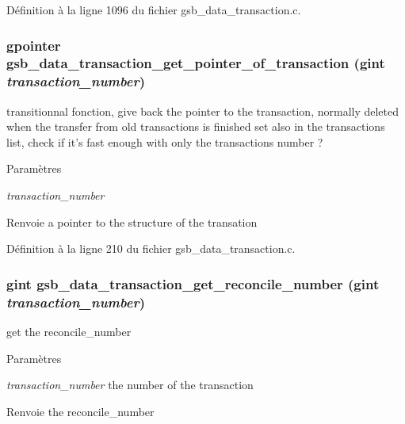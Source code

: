 Définition à la ligne 1096 du fichier gsb\_\-data\_\-transaction.c.

\subsubsection[{gsb\_\-data\_\-transaction\_\-get\_\-pointer\_\-of\_\-transaction}]{\setlength{\rightskip}{0pt plus 5cm}gpointer gsb\_\-data\_\-transaction\_\-get\_\-pointer\_\-of\_\-transaction (gint {\em transaction\_\-number})}\label{gsb__data__transaction_8h_a4d90c43dcc4db054a1e2ec3b9ff45acc}
transitionnal fonction, give back the pointer to the transaction, normally deleted when the transfer from old transactions is finished set also in the transactions list, check if it's fast enough with only the transactions number ?


\begin{DoxyParams}{Paramètres}
\item[{\em transaction\_\-number}]\end{DoxyParams}
\begin{DoxyReturn}{Renvoie}
a pointer to the structure of the transation 
\end{DoxyReturn}


Définition à la ligne 210 du fichier gsb\_\-data\_\-transaction.c.

\subsubsection[{gsb\_\-data\_\-transaction\_\-get\_\-reconcile\_\-number}]{\setlength{\rightskip}{0pt plus 5cm}gint gsb\_\-data\_\-transaction\_\-get\_\-reconcile\_\-number (gint {\em transaction\_\-number})}\label{gsb__data__transaction_8h_a1f902ce2841e41d3eda536f2fdd3c32f}
get the reconcile\_\-number 
\begin{DoxyParams}{Paramètres}
\item[{\em transaction\_\-number}]the number of the transaction \end{DoxyParams}
\begin{DoxyReturn}{Renvoie}
the reconcile\_\-number 
\end{DoxyReturn}


